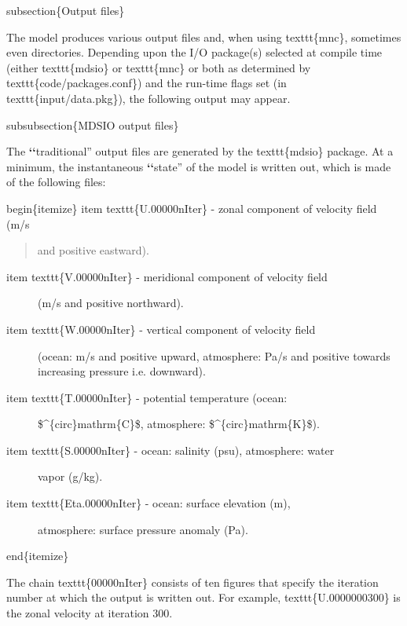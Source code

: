\documentclass[letterpaper,10pt,english]{sphinxmanual}
\begin{document}
subsection\{Output files\}

The model produces various output files and, when using texttt\{mnc\},
sometimes even directories.  Depending upon the I/O package(s)
selected at compile time (either texttt\{mdsio\} or texttt\{mnc\} or
both as determined by texttt\{code/packages.conf\}) and the run-time
flags set (in texttt\{input/data.pkg\}), the following output may
appear.

subsubsection\{MDSIO output files\}

The {\color{red}\bfseries{}{}`{}`}traditional'' output files are generated by the texttt\{mdsio\}
package.  At a minimum, the instantaneous {\color{red}\bfseries{}{}`{}`}state'' of the model is
written out, which is made of the following files:

begin\{itemize\}
item texttt\{U.00000nIter\} - zonal component of velocity field (m/s
\begin{quote}

and positive eastward).
\end{quote}
\begin{description}
\item[{item texttt\{V.00000nIter\} - meridional component of velocity field}] \leavevmode
(m/s and positive northward).

\item[{item texttt\{W.00000nIter\} - vertical component of velocity field}] \leavevmode
(ocean: m/s and positive upward, atmosphere: Pa/s and positive
towards increasing pressure i.e. downward).

\item[{item texttt\{T.00000nIter\} - potential temperature (ocean:}] \leavevmode
\$\textasciicircum{}\{circ\}mathrm\{C\}\$, atmosphere: \$\textasciicircum{}\{circ\}mathrm\{K\}\$).

\item[{item texttt\{S.00000nIter\} - ocean: salinity (psu), atmosphere: water}] \leavevmode
vapor (g/kg).

\item[{item texttt\{Eta.00000nIter\} - ocean: surface elevation (m),}] \leavevmode
atmosphere: surface pressure anomaly (Pa).

\end{description}

end\{itemize\}

The chain texttt\{00000nIter\} consists of ten figures that specify the
iteration number at which the output is written out. For example,
texttt\{U.0000000300\} is the zonal velocity at iteration 300.
\end{document}

